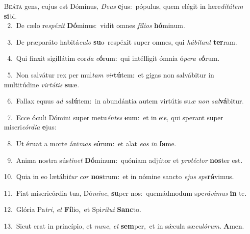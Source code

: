 \lettrine{\initial\textcolor{\initialcolor}{B}}{eáta} gens, cujus est Dóminus, \textit{De}\-\textit{us} \textbf{e}\-jus:~\star pópulus, quem elégit in here\-\textit{di}\-\textit{tá}\textit{tem} \textbf{si}\-bi.\\
{\numbfont\textcolor{\numbcolor}{~2.}}~De cælo re\-\textit{spé}\-\textit{xit} \textbf{Dó}\-minus:~\star vidit omnes \textit{fí}\-\textit{li}\textit{os} \textbf{hó}\-minum.\par
{\numbfont\textcolor{\numbcolor}{~3.}}~De præparáto habitá\-\textit{cu}\-\textit{lo} \textbf{su}\-o~\star respéxit super omnes, qui \textit{há}\-\textit{bi}\textit{tant} \textbf{ter}\-ram.\par
{\numbfont\textcolor{\numbcolor}{~4.}}~Qui finxit sigillátim cor\textit{da} \textit{e}\-\textbf{ó}rum:~\star qui intélligit ómnia ó\-\textit{pe}\-\textit{ra} \textit{e}\-\textbf{ó}rum.\par
{\numbfont\textcolor{\numbcolor}{~5.}}~Non salvátur rex per mul\textit{tam} \textit{vir}\-\textbf{tú}tem:~\star et gigas non salvábitur in multitúdine \textit{vir}\-\textit{tú}\textit{tis} \textbf{su}\-æ.\par
{\numbfont\textcolor{\numbcolor}{~6.}}~Fallax equus \textit{ad} \textit{sa}\-\textbf{lú}tem:~\star in abundántia autem virtútis su\textit{æ} \textit{non} \textit{sal}\-\textbf{vá}bitur.\par
{\numbfont\textcolor{\numbcolor}{~7.}}~Ecce óculi Dómini super metu\-\textit{én}\-\textit{tes} \textbf{e}\-um:~\star et in eis, qui sperant super miseri\-\textit{cór}\-\textit{di}\textit{a} \textbf{e}\-jus:\par
{\numbfont\textcolor{\numbcolor}{~8.}}~Ut éruat a morte áni\textit{mas} \textit{e}\-\textbf{ó}rum:~\star et alat \textit{e}\-\textit{os} \textit{in} \textbf{fa}\-me.\par
{\numbfont\textcolor{\numbcolor}{~9.}}~Anima nostra sús\-\textit{ti}\-\textit{net} \textbf{Dó}\-minum:~\star quóniam adjútor et \textit{pro}\-\textit{téc}\textit{tor} \textbf{nos}\-ter est.\par
{\numbfont\textcolor{\numbcolor}{10.}}~Quia in eo lætábi\textit{tur} \textit{cor} \textbf{nos}\-trum:~\star et in nómine sancto \textit{e}\-\textit{jus} \textit{spe}\-\textbf{rá}vimus.\par
{\numbfont\textcolor{\numbcolor}{11.}}~Fiat misericórdia tua, Dó\-\textit{mi}\-\textit{ne}, \textbf{su}\-per nos:~\star quemádmodum spe\-\textit{rá}\-\textit{vi}\textit{mus} \textbf{in} te.\par
{\numbfont\textcolor{\numbcolor}{12.}}~Glória Pa\-\textit{tri}\-, \textit{et} \textbf{Fí}\-lio,~\star et Spi\-\textit{rí}\-\textit{tu}\textit{i} \textbf{Sanc}\-to.\par
{\numbfont\textcolor{\numbcolor}{13.}}~Sicut erat in princípio, et \textit{nunc}\-, \textit{et} \textbf{sem}\-per,~\star et in sǽcula sæ\-\textit{cu}\-\textit{ló}\textit{rum}. \textbf{A}\-men.\par
